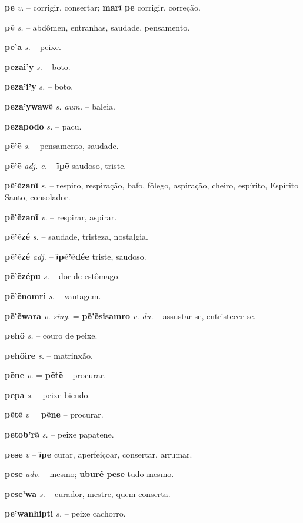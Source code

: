 \textbf{pe} \textit{v.} -- corrigir, consertar; \textbf{marĩ pe} corrigir, correção.

\textbf{pẽ} \textit{s.} -- abdômen, entranhas, saudade, pensamento.

\textbf{pe'a} \textit{s.} -- peixe.

\textbf{pezai'y} \textit{s.} -- boto.

\textbf{peza'i'y} \textit{s.} -- boto.

\textbf{peza'ywawẽ} \textit{s. aum.} -- baleia.

\textbf{pezapodo} \textit{s.} -- pacu.

\textbf{pẽ'ẽ} \textit{s.} -- pensamento, saudade.

\textbf{pẽ'ẽ} \textit{adj. c.} -- \textbf{ĩpẽ} saudoso, triste.

\textbf{pẽ'ẽzanĩ} \textit{s.} -- respiro, respiração, bafo, fôlego, aspiração, cheiro, espírito, Espírito Santo, consolador.

\textbf{pẽ'ẽzanĩ} \textit{v.} -- respirar, aspirar.

\textbf{pẽ'ẽzé} \textit{s.} -- saudade, tristeza, nostalgia.

\textbf{pẽ'ẽzé} \textit{adj.} -- \textbf{ĩpẽ'ẽdée} triste, saudoso.

\textbf{pẽ'ẽzépu} \textit{s.} -- dor de estômago.

\textbf{pẽ'ẽnomri} \textit{s.} -- vantagem.

\textbf{pẽ'ẽwara} \textit{v. sing.} = \textbf{pẽ'ẽsisamro} \textit{v. du.} -- assustar-se, entristecer-se.

\textbf{pehö} \textit{s.} -- couro de peixe.

\textbf{pehöire} \textit{s.} -- matrinxão.

\textbf{pẽne} \textit{v.} = \textbf{pẽtẽ} -- procurar.

\textbf{pepa} \textit{s.} -- peixe bicudo.

\textbf{pẽtẽ} \textit{v} = \textbf{pẽne} -- procurar.

\textbf{petob'rã} \textit{s.} -- peixe papatene.

\textbf{pese} \textit{v} -- \textbf{ĩpe} curar, aperfeiçoar, consertar, arrumar.

\textbf{pese} \textit{adv.} -- mesmo; \textbf{uburé pese} tudo mesmo.

\textbf{pese'wa} \textit{s.} -- curador, mestre, quem conserta.

\textbf{pe'wanhipti} \textit{s.} -- peixe cachorro.

